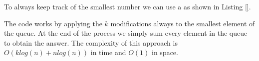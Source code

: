 To always keep track of the smallest number we can use a  as shown in Listing \ref{}.



The code works by applying the $k$ modifications always to the smallest element of the queue. At the end of the process we simply sum every element in the queue to obtain the answer. The complexity of this approach is $O(klog(n) + nlog(n))$ in time and $O(1)$ in space.

